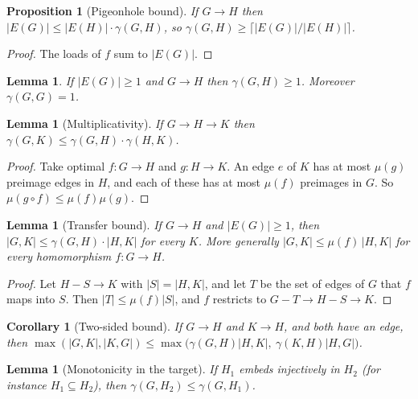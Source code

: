 \documentclass{article}
\newtheorem{proposition}[theorem]{Proposition}
\newtheorem{lemma}[theorem]{Lemma}
\newtheorem{corollary}[theorem]{Corollary}
\theoremstyle{definition}
\begin{document}
\begin{proposition}[Pigeonhole bound]
\label{prop:pigeonhole}
If $G\to H$ then $|E(G)|\le|E(H)|\cdot\gamma(G,H)$, so
$\gamma(G,H)\ge\lceil|E(G)|/|E(H)|\rceil$.
\end{proposition}

\begin{proof}
The loads of $f$ sum to $|E(G)|$.
\end{proof}

\begin{lemma}
\label{lem:gamma_basic}
If $|E(G)|\ge1$ and $G\to H$ then $\gamma(G,H)\ge1$.  Moreover $\gamma(G,G)=1$.
\end{lemma}

\begin{lemma}[Multiplicativity]
\label{lem:gamma_mult}
If $G\to H\to K$ then $\gamma(G,K)\le\gamma(G,H)\cdot\gamma(H,K)$.
\end{lemma}

\begin{proof}
Take optimal $f\colon G\to H$ and $g\colon H\to K$.  An edge $e$ of $K$ has at
most $\mu(g)$ preimage edges in $H$, and each of these has at most $\mu(f)$
preimages in $G$.  So $\mu(g\circ f)\le\mu(f)\mu(g)$.
\end{proof}

\begin{lemma}[Transfer bound]
\label{lem:nhf_bound}
If $G\to H$ and $|E(G)|\ge1$, then $|G,K|\le\gamma(G,H)\cdot|H,K|$ for every $K$.
More generally $|G,K|\le\mu(f)\,|H,K|$ for every homomorphism $f\colon G\to H$.
\end{lemma}

\begin{proof}
Let $H-S\to K$ with $|S|=|H,K|$, and let $T$ be the set of edges of $G$ that $f$
maps into $S$.  Then $|T|\le\mu(f)|S|$, and $f$ restricts to
$G-T\to H-S\to K$.
\end{proof}

\begin{corollary}[Two-sided bound]
\label{cor:two_sided}
If $G\to H$ and $K\to H$, and both have an edge, then
$\max(|G,K|,|K,G|)\le\max\bigl(\gamma(G,H)|H,K|,\ \gamma(K,H)|H,G|\bigr)$.
\end{corollary}

\begin{lemma}[Monotonicity in the target]
\label{lem:gamma_mono}
If $H_1$ embeds injectively in $H_2$ (for instance $H_1\subseteq H_2$), then
$\gamma(G,H_2)\le\gamma(G,H_1)$.
\end{lemma}
\end{document}
